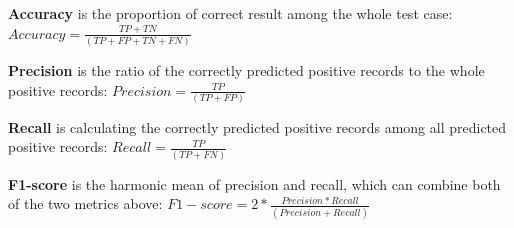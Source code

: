 \textbf{Accuracy} is the proportion of correct result among the whole test case: 
$ Accuracy = \frac{TP+TN}{(TP+FP+TN+FN)} $

\textbf{Precision} is the ratio of the correctly predicted positive records to the whole positive records:
$ Precision = \frac{TP}{(TP+FP)} $

\textbf{Recall} is calculating the correctly predicted positive records among all predicted positive records:
$ Recall = \frac{TP}{(TP+FN)} $

\textbf{F1-score}  is the harmonic mean of precision and recall, which can combine both of the two metrics above:
$ F1-score = 2*\frac{Precision*Recall}{(Precision+Recall)} $



